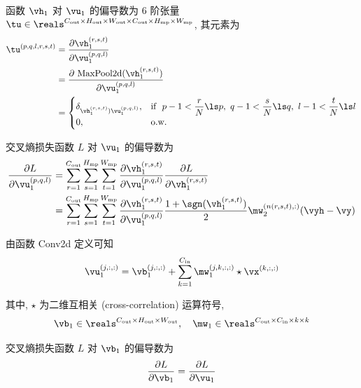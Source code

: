 \documentclass[openany]{ctexbook}
\theoremstyle{kaiti}
\theoremstyle{normal}
\begin{document}
函数 $\vh_1$ 对 $\vu_1$ 的偏导数为 6 阶张量 $\tu\in\reals^{C_{\text{out}}\times H_{\text{out}}\times W_{\text{out}}\times C_{\text{out}}\times H_{\text{mp}}\times W_{\text{mp}}}$, 其元素为
\begin{equation}
  \begin{aligned}
    \tu^{(p,q,l,r,s,t)}
    &=\frac{\partial\vh_1^{(r,s,t)}}{\partial\vu_1^{(p,q,l)}}\\
    &=\frac{\partial~\mathrm{MaxPool2d}(\vh_1^{(r,s,t)})}{\partial\vu_1^{(p,q,l)}}\\
    &=\begin{cases}
      \delta_{\vh_1^{(r,s,t)})\vu_1^{(p,q,l)}},&\text{if}~~p-1<\dfrac{r}{N}\ls p,~q-1<\dfrac{s}{N}\ls q,~l-1<\dfrac{t}{N}\ls l\\[1mm]
      0,&\text{o.w.}
    \end{cases}
  \end{aligned}
\end{equation}

交叉熵损失函数 $L$ 对 $\vu_1$ 的偏导数为
\begin{equation}
  \begin{aligned}
    \frac{\partial L}{\partial\vu_1^{(p,q,l)}}
    &=\sum_{r=1}^{C_{\text{out}}}\sum_{s=1}^{H_{\text{mp}}}\sum_{t=1}^{W_{\text{mp}}}
    \frac{\partial\vh_1^{(r,s,t)}}{\partial\vu_1^{(p,q,l)}}
    \frac{\partial L}{\partial\vh_1^{(r,s,t)}}\\
    &=\sum_{r=1}^{C_{\text{out}}}\sum_{s=1}^{H_{\text{mp}}}\sum_{t=1}^{W_{\text{mp}}}
    \frac{\partial\vh_1^{(r,s,t)}}{\partial\vu_1^{(p,q,l)}}
    \frac{1+\sgn(\vh_1^{(r,s,t)})}{2}\mw_2^{(n(r,s,t),:)}(\vyh-\vy)\\
  \end{aligned}
\end{equation}

由函数 Conv2d 定义可知
\begin{equation}
  \vu_1^{(j,:,:)}=\vb_1^{(j,:,:)}+\sum_{k=1}^{C_{\text{in}}}\mw_1^{(j,k,:,:)}\star\vx^{(k,:,:)}
\end{equation}

其中, $\star$ 为二维互相关 (cross-correlation) 运算符号,
\begin{equation}
  \vb_1\in\reals^{C_{\text{out}}\times H_{\text{out}}\times W_{\text{out}}},
  \quad
  \mw_1\in\reals^{C_{\text{out}}\times C_{\text{in}}\times k\times k}
\end{equation}

交叉熵损失函数 $L$ 对 $\vb_1$ 的偏导数为
\begin{equation}
  \frac{\partial L}{\partial\vb_1}=\frac{\partial L}{\partial\vu_1}
\end{equation}
\end{document}
